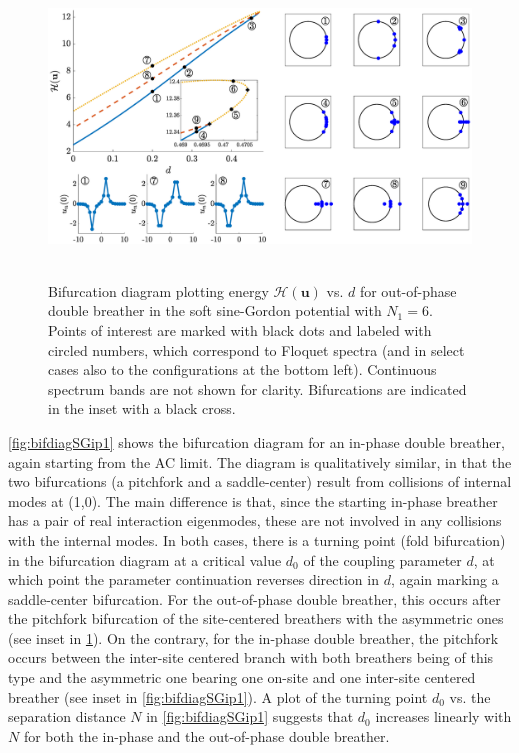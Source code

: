 \documentclass[12pt,reqno]{amsart}
\newcommand{\uvec}{\mathbf{u}}
\theoremstyle{definition}
\begin{document}
\begin{figure}
	\hbox{
	\hspace{-2cm}
	\includegraphics[width=20cm]{bifdiagSGoppositeN6.eps} 
	}
	\caption{Bifurcation diagram plotting energy $\mathcal{H}(\uvec)$ vs. $d$ for out-of-phase double breather in the soft sine-Gordon potential with $N_1 = 6$. Points of interest are marked with black dots and labeled with circled numbers, which correspond to Floquet spectra (and in select cases also to the configurations at the bottom left). Continuous spectrum bands are not shown for clarity. Bifurcations are indicated in the inset with a black cross.}
	\label{fig:bifdiagSGoop1}
\end{figure}

\cref{fig:bifdiagSGip1} shows the bifurcation diagram for an in-phase double breather, again starting from the AC limit. The diagram is qualitatively similar, in that the two bifurcations (a pitchfork
and a saddle-center) result from collisions of internal modes at (1,0). The main difference is that, since the starting in-phase breather has a pair of real interaction eigenmodes, these are not involved in any collisions with the internal modes. In both cases, there is a turning point (fold bifurcation) in the bifurcation diagram at a critical value $d_0$ of the coupling parameter $d$, at which point the parameter continuation reverses direction in $d$, again marking a saddle-center 
bifurcation. For the out-of-phase double breather, this occurs after the pitchfork bifurcation of the site-centered breathers with 
the asymmetric ones (see inset in \cref{fig:bifdiagSGoop1}).
On the contrary, for the in-phase double breather, 
the pitchfork occurs between the inter-site centered
branch with both breathers being of this type and the 
asymmetric one bearing one on-site and one inter-site centered
breather (see inset in \cref{fig:bifdiagSGip1}). A plot of the turning point $d_0$ vs. the separation distance $N$ in \cref{fig:bifdiagSGip1} suggests that $d_0$ increases linearly with $N$ for both the in-phase and the out-of-phase double breather.
\end{document}
